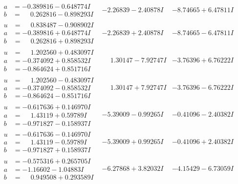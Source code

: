 \documentclass[1p]{elsarticle_modified}
\theoremstyle{definition}
\begin{document}
$$\begin{array}{c|c|c}
\begin{aligned}
a &= -0.389816 - 0.648774 I \\
b &= \phantom{-}0.262816 - 0.898293 I\end{aligned}
 & -2.26839 - 2.40878 I & -8.74665 + 6.47811 I \\ \hline\begin{aligned}
u &= \phantom{-}0.838487 - 0.908902 I \\
a &= -0.389816 + 0.648774 I \\
b &= \phantom{-}0.262816 + 0.898293 I\end{aligned}
 & -2.26839 + 2.40878 I & -8.74665 - 6.47811 I \\ \hline\begin{aligned}
u &= \phantom{-}1.202560 + 0.483097 I \\
a &= -0.374092 + 0.858532 I \\
b &= -0.864624 + 0.851716 I\end{aligned}
 & \phantom{-}1.30147 - 7.92747 I & -3.76396 + 6.76222 I \\ \hline\begin{aligned}
u &= \phantom{-}1.202560 - 0.483097 I \\
a &= -0.374092 - 0.858532 I \\
b &= -0.864624 - 0.851716 I\end{aligned}
 & \phantom{-}1.30147 + 7.92747 I & -3.76396 - 6.76222 I \\ \hline\begin{aligned}
u &= -0.617636 + 0.146970 I \\
a &= \phantom{-}1.43119 + 0.59789 I \\
b &= -0.971827 - 0.158937 I\end{aligned}
 & -5.39009 - 0.99265 I & -0.41096 - 2.40382 I \\ \hline\begin{aligned}
u &= -0.617636 - 0.146970 I \\
a &= \phantom{-}1.43119 - 0.59789 I \\
b &= -0.971827 + 0.158937 I\end{aligned}
 & -5.39009 + 0.99265 I & -0.41096 + 2.40382 I \\ \hline\begin{aligned}
u &= -0.575316 + 0.265705 I \\
a &= -1.16602 - 1.04883 I \\
b &= \phantom{-}0.949508 + 0.293589 I\end{aligned}
 & -6.27868 + 3.82032 I & -4.15429 - 6.73059 I \\ \hline\begin{aligned}

\end{aligned}
\end{array}$$
\end{document}
